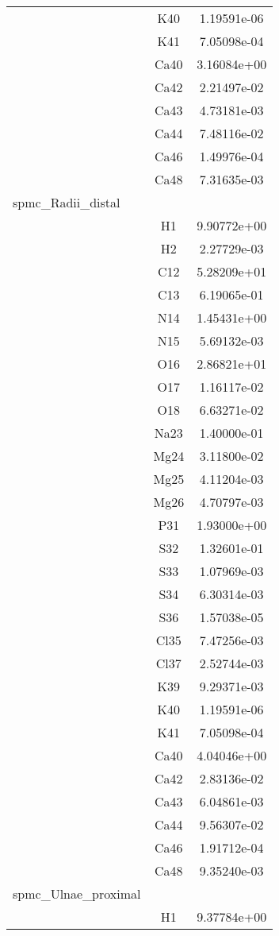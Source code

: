 \begin{centering}
\begin{longtable}{l c c}
& K40 & 1.19591e-06 \\ 
& K41 & 7.05098e-04 \\ 
& Ca40 & 3.16084e+00 \\ 
& Ca42 & 2.21497e-02 \\ 
& Ca43 & 4.73181e-03 \\ 
& Ca44 & 7.48116e-02 \\ 
& Ca46 & 1.49976e-04 \\ 
& Ca48 & 7.31635e-03 \\ 
\hline
spmc\_Radii\_distal & & \\
\hline
& H1 & 9.90772e+00 \\ 
& H2 & 2.27729e-03 \\ 
& C12 & 5.28209e+01 \\ 
& C13 & 6.19065e-01 \\ 
& N14 & 1.45431e+00 \\ 
& N15 & 5.69132e-03 \\ 
& O16 & 2.86821e+01 \\ 
& O17 & 1.16117e-02 \\ 
& O18 & 6.63271e-02 \\ 
& Na23 & 1.40000e-01 \\ 
& Mg24 & 3.11800e-02 \\ 
& Mg25 & 4.11204e-03 \\ 
& Mg26 & 4.70797e-03 \\ 
& P31 & 1.93000e+00 \\ 
& S32 & 1.32601e-01 \\ 
& S33 & 1.07969e-03 \\ 
& S34 & 6.30314e-03 \\ 
& S36 & 1.57038e-05 \\ 
& Cl35 & 7.47256e-03 \\ 
& Cl37 & 2.52744e-03 \\ 
& K39 & 9.29371e-03 \\ 
& K40 & 1.19591e-06 \\ 
& K41 & 7.05098e-04 \\ 
& Ca40 & 4.04046e+00 \\ 
& Ca42 & 2.83136e-02 \\ 
& Ca43 & 6.04861e-03 \\ 
& Ca44 & 9.56307e-02 \\ 
& Ca46 & 1.91712e-04 \\ 
& Ca48 & 9.35240e-03 \\ 
\hline
spmc\_Ulnae\_proximal & & \\
\hline
& H1 & 9.37784e+00 \\ 

\end{longtable}
\end{centering}

